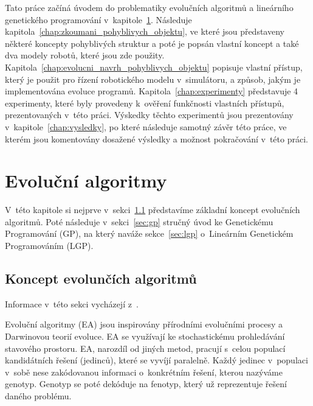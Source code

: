 Tato práce začíná úvodem do problematiky evolučních algoritmů a lineárního genetického programování v~kapitole~\ref{chap:evolucni_algoritmy}.
Následuje kapitola~\ref{chap:zkoumani_pohyblivych_objektu}, ve které jsou představeny některé koncepty pohyblivých struktur a poté je popsán vlastní koncept a také dva modely robotů, které jsou zde použity.
Kapitola~\ref{chap:evolucni_navrh_pohyblivych_objektu} popisuje vlastní přístup, který je použit pro řízení robotického modelu v~simulátoru, a způsob, jakým je implementována evoluce programů.
Kapitola~\ref{chap:experimenty} představuje 4 experimenty, které byly provedeny k~ověření funkčnosti vlastních přístupů, prezentovaných v~této práci.
Výskedky těchto experimentů jsou prezentovány v~kapitole~\ref{chap:vysledky}, po které následuje samotný závěr této práce, ve kterém jsou komentovány dosažené výsledky a možnost pokračování v~této práci.


\chapter{Evoluční algoritmy}
\label{chap:evolucni_algoritmy}

V~této kapitole si nejprve v~sekci~\ref{sec:koncept_ea} představíme základní koncept evolučních algoritmů.
Poté následuje v~sekci~\ref{sec:gp} stručný úvod ke Genetickému Programování (GP), na který naváže sekce~\ref{sec:lgp} o~Lineárním Genetickém Programováním (LGP).

\section{Koncept evolunčích algoritmů}
\label{sec:koncept_ea}
Informace v~této sekci vycházejí z~\cite{Eiben2015}.

Evoluční algoritmy (EA) jsou inspirovány přírodními evolučními procesy a Darwinovou teorií evoluce.
EA se využívají ke stochastickému prohledávání stavového prostoru.
EA, narozdíl od jiných metod, pracují s~celou populací kandidátních řešení (jedinců), které se vyvíjí paralelně.
Každý jedinec v~populaci v~sobě nese zakódovanou informaci o~konkrétním řešení, kterou nazýváme genotyp.
Genotyp se poté dekóduje na fenotyp, který už reprezentuje řešení daného problému.

